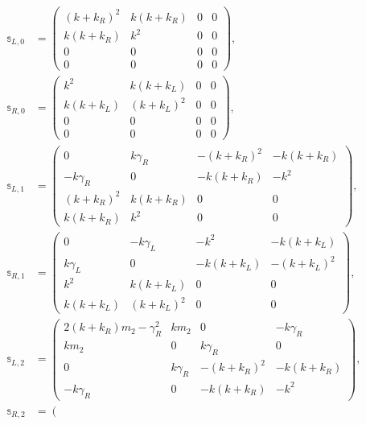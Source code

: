 \begin{align}
    \mathbb{s}_{L,0} &=
    \left(
    \begin{array}{cccc}
      (k+k_R)^2 & k (k+k_R) & 0 & 0 \\
      k (k+k_R) & k^2 & 0 & 0 \\
      0 & 0 & 0 & 0 \\
      0 & 0 & 0 & 0
    \end{array}
    \right),
    \nonumber\\
    \mathbb{s}_{R,0} & =
    \left(
    \begin{array}{cccc}
      k^2 & k (k+k_L) & 0 & 0 \\
      k (k+k_L) & (k+k_L)^2 & 0 & 0 \\
      0 & 0 & 0 & 0 \\
      0 & 0 & 0 & 0
    \end{array}
    \right),
    \nonumber\\
    \mathbb{s}_{L,1} &= \left(
    \begin{array}{cccc}
      0 & k \gamma_R & -(k+k_R)^2 & -k (k+k_R) \\
      -k \gamma_R & 0 & -k (k+k_R) & -k^2 \\
      (k+k_R)^2 & k (k+k_R) & 0 & 0 \\
      k (k+k_R) & k^2 & 0 & 0
    \end{array}
    \right),
    \nonumber\\
    \mathbb{s}_{R,1} & = \left(
    \begin{array}{cccc}
      0 & -k \gamma_L & -k^2 & -k (k+k_L) \\
      k \gamma_L & 0 & -k (k+k_L) & -(k+k_L)^2 \\
      k^2 & k (k+k_L) & 0 & 0 \\
      k (k+k_L) & (k+k_L)^2 & 0 & 0
    \end{array}
    \right),
    \nonumber\\
    \mathbb{s}_{L,2} &= \left(
    \begin{array}{cccc}
      2 (k+k_R) m_2-\gamma_R^2 & k m_2 & 0 & -k \gamma_R \\
      k m_2 & 0 & k \gamma_R & 0 \\
      0 & k \gamma_R & -(k+k_R)^2 & -k (k+k_R) \\
      -k \gamma_R & 0 & -k (k+k_R) & -k^2
    \end{array}
    \right),
    \nonumber\\
    \mathbb{s}_{R,2} & = \left(

\end{align}
